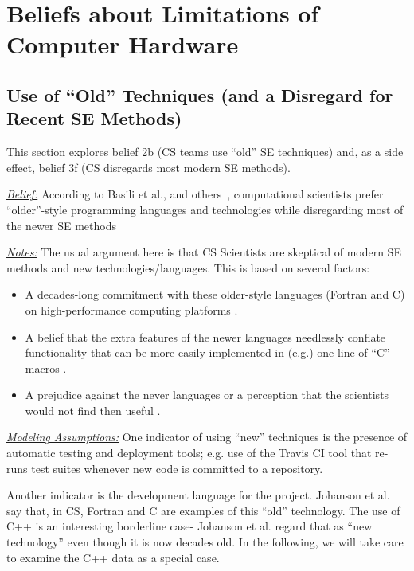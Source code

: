 \documentclass[sigconf,review,anonymous]{acmart}
\begin{document}
\section{Beliefs about Limitations of Computer Hardware}


\subsection{Use of ``Old'' Techniques (and a Disregard for  Recent SE Methods)}\label{lang}
This section explores belief 2b (CS teams use ``old'' SE techniques)
and, as a side effect, belief 3f (CS disregards most modern SE methods).

\noindent \textit{\underline{Belief:}} According to Basili et al., and others~\cite{basili08_hpc, carver07_environment, Prabhu11_cssurvey, kendall05_C, ragan14_pythoncs},
computational scientists prefer
``older''-style programming languages and technologies while disregarding most of the newer SE methods

\noindent \textit{\underline{Notes:}} The usual argument here is that CS Scientists are skeptical of modern SE methods and new technologies/languages.
This is based on several factors: 
\begin{itemize}
  \item A decades-long commitment with these older-style languages (Fortran and C) on high-performance computing platforms \cite{faulk09_secs}.
  \item A belief that the extra features of the newer languages needlessly conflate functionality that can be more easily implemented in (e.g.) one line of ``C'' macros \cite{sanders08_risk}. 
  \item A prejudice against the never languages or a perception that the scientists would not find then useful \cite{Prabhu11_cssurvey}. 
\end{itemize}



\noindent \textit{\underline{Modeling Assumptions:}} 
One indicator of using ``new'' techniques is the presence of automatic testing and deployment tools; e.g. use of the Travis CI tool that re-runs test suites whenever new code is committed to a repository. 

Another indicator is the development language for the project. 
Johanson et al.~\cite{johan18_secs} say that, in CS, Fortran and C are examples of this ``old'' technology. The use of C++ is an interesting borderline case- Johanson et al. regard that as ``new technology'' even though it is now decades old. In the following, we will take care to examine the C++ data as a special case.
\end{document}
